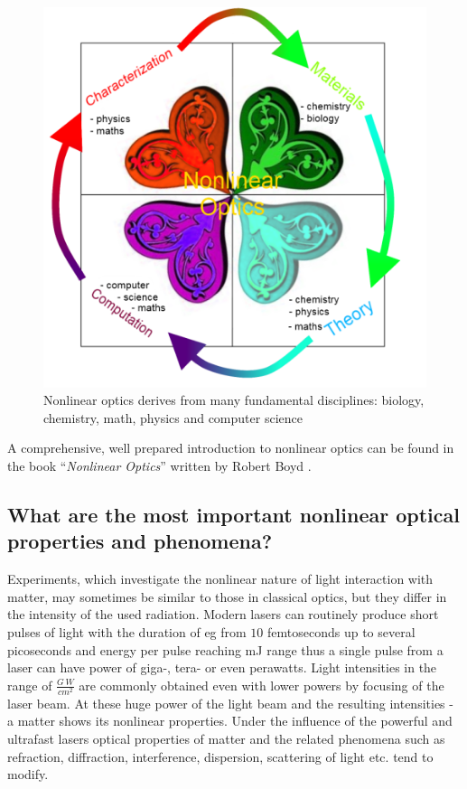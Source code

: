 \documentclass[12pt,twoside,a4paper]{article}
\numberwithin{equation}{subsection}
\numberwithin{figure}{subsection}
\begin{document}
\begin{figure} 
 \includegraphics{img/nlo.png}
 \caption{ Nonlinear optics derives from many fundamental disciplines: biology, chemistry, math, physics and computer science
 \label{fig:nonlinear_optics}}
\end{figure}

A comprehensive, well prepared introduction to nonlinear optics can be found in the book ``\textit{Nonlinear Optics}'' written 
by Robert Boyd \cite{boyd_nlo}.

\subsection{What are the most important nonlinear optical properties and phenomena?} \label{chap:introducion_phenomena}

Experiments, which investigate the nonlinear nature of light interaction with matter, may sometimes be similar to those in
classical optics, but they differ in the intensity of the used radiation. Modern lasers can routinely produce short
pulses of light with the duration of eg from $10$ femtoseconds up to several picoseconds and energy per pulse reaching mJ range thus a
single pulse from a laser can have power of giga-, tera- or even perawatts. Light intensities in the range of $\frac{G\,W}{cm^2}$
are commonly obtained even with lower powers by focusing of the laser beam. At these huge power of the light beam and the resulting
intensities - a matter shows its nonlinear properties. Under the influence of the powerful and ultrafast lasers optical properties
of matter and the related phenomena such as refraction, diffraction, interference, dispersion, scattering of light etc. tend to
modify.
\end{document}
